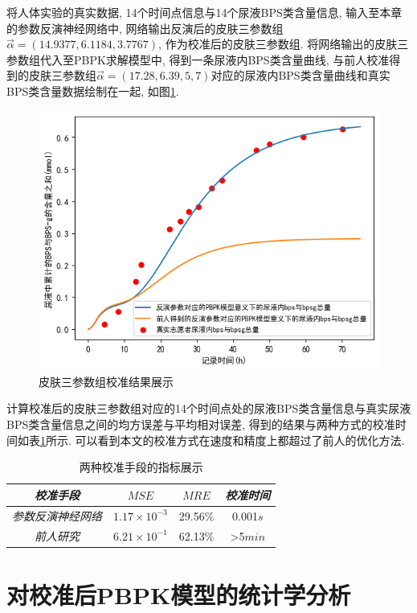 \documentclass[a4paper,punct=banjiao,twoside]{ctexrep}
\theoremstyle{plain}
\theoremstyle{definition}
\theoremstyle{remark}
\begin{document}
将人体实验的真实数据, 14个时间点信息与14个尿液BPS类含量信息, 输入至本章的参数反演神经网络中, 网络输出反演后的皮肤三参数组$\vec{\alpha}=(14.9377,  6.1184,  3.7767)$, 作为校准后的皮肤三参数组.
将网络输出的皮肤三参数组代入至PBPK求解模型中, 得到一条尿液内BPS类含量曲线, 与前人校准得到的皮肤三参数组$\vec{\alpha}=(17.28,  6.39,  5,7)$对应的尿液内BPS类含量曲线和真实BPS类含量数据绘制在一起, 如图\ref{校准}.
\begin{figure}[H]
  \centering
  \includegraphics[scale=0.5]{./figs/p8.png}
  \caption{皮肤三参数组校准结果展示}
  \label{校准}
\end{figure}
\noindent 计算校准后的皮肤三参数组对应的14个时间点处的尿液BPS类含量信息与真实尿液BPS类含量信息之间的均方误差与平均相对误差, 得到的结果与两种方式的校准时间如表\ref{tab8}所示.
可以看到本文的校准方式在速度和精度上都超过了前人\cite{11}的优化方法.
\begin{table}[htbp]
  \centering
  \begin{tabular}[t]{c*{3}{c}}
    \hline
    \textit{校准手段} &$MSE$&$MRE$&\textit{校准时间}\\
    \hline
    \textit{参数反演神经网络} & $1.17\times 10^{-3}$  &   29.56\% &0.001$s$  \\ 
    \textit{前人研究} & $6.21\times 10^{-1}$  &  62.13\%    & >5$min$   \\ 
    \hline
  \end{tabular}
  \caption{\label{tab8}两种校准手段的指标展示} 
\end{table}  

\section{对校准后PBPK模型的统计学分析}
\end{document}
